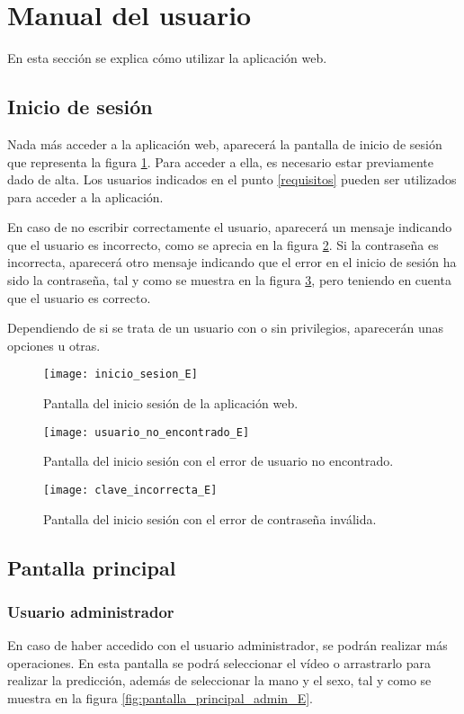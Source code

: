 \section{Manual del usuario}
En esta sección se explica cómo utilizar la aplicación web.

\subsection{Inicio de sesión}
Nada más acceder a la aplicación web, aparecerá la pantalla de inicio de sesión que representa la figura \ref{fig:inicio_sesion_E}. Para acceder a ella, es necesario estar previamente dado de alta. Los usuarios indicados en el punto \ref{requisitos} pueden ser utilizados para acceder a la aplicación.

En caso de no escribir correctamente el usuario, aparecerá un mensaje indicando que el usuario es incorrecto, como se aprecia en la figura \ref{fig:usuario_no_encontrado_E}. Si la contraseña es incorrecta, aparecerá otro mensaje indicando que el error en el inicio de sesión ha sido la contraseña, tal y como se muestra en la figura \ref{fig:clave_incorrecta_E}, pero teniendo en cuenta que el usuario es correcto.

Dependiendo de si se trata de un usuario con o sin privilegios, aparecerán unas opciones u otras.

\begin{figure}[ht]
	\texttt{[image: inicio\_sesion\_E]}
	\caption{Pantalla del inicio sesión de la aplicación web.}
	\label{fig:inicio_sesion_E}
\end{figure}

\begin{figure}[ht]
	\texttt{[image: usuario\_no\_encontrado\_E]}
	\caption{Pantalla del inicio sesión con el error de usuario no encontrado.}
	\label{fig:usuario_no_encontrado_E}
\end{figure}

\begin{figure}[ht]
	\texttt{[image: clave\_incorrecta\_E]}
	\caption{Pantalla del inicio sesión con el error de contraseña inválida.}
	\label{fig:clave_incorrecta_E}
\end{figure}

\subsection{Pantalla principal}

\subsubsection{Usuario administrador}
En caso de haber accedido con el usuario administrador, se podrán realizar más operaciones. En esta pantalla se podrá seleccionar el vídeo o arrastrarlo para realizar la predicción, además de seleccionar la mano y el sexo, tal y como se muestra en la figura \ref{fig:pantalla_principal_admin_E}.

